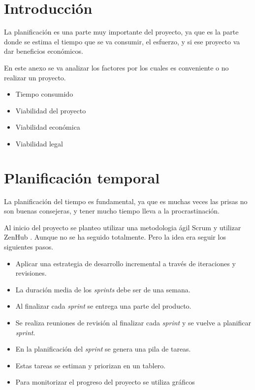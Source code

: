 
\section{Introducción}

La planificación es una parte muy importante del proyecto, ya que es la parte donde se estima el tiempo que se va consumir, el esfuerzo, y si ese proyecto va dar beneficios económicos.

En este anexo se va analizar los factores por los cuales es conveniente o no realizar un proyecto.
\begin{itemize}
\item
Tiempo consumido
\item
Viabilidad del proyecto
\item
Viabilidad económica
\item
Viabilidad legal
\end{itemize}
\section{Planificación temporal}

La planificación del tiempo es fundamental, ya que es muchas veces las prisas no son buenas consejeras, y tener mucho tiempo lleva a la procrastinación.

Al inicio del proyecto se planteo utilizar una metodologia ágil Scrum y utilizar ZenHub . Aunque no se ha seguido totalmente. Pero la idea era seguir los siguientes pasos.

\begin{itemize}
\item
  Aplicar una estrategia de desarrollo incremental a través de
  iteraciones y revisiones.
\item
  La duración media de los \emph{sprints} debe ser de una semana.
\item
  Al finalizar cada \emph{sprint} se entrega una parte del producto.
\item
  Se realiza reuniones de revisión al finalizar cada \emph{sprint} y se vuelve a planificar \emph{sprint}.
\item
  En la planificación del \emph{sprint} se genera una pila de tareas.
\item
  Estas tareas se estiman y priorizan en un tablero.
\item
  Para monitorizar el progreso del proyecto se utiliza gráficos
\end{itemize}


